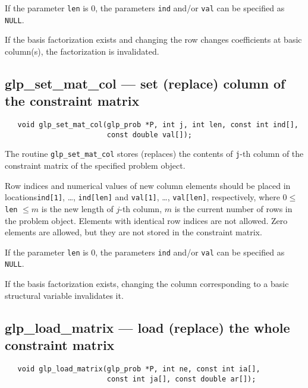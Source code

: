 If the parameter \verb|len| is 0, the parameters \verb|ind| and/or
\verb|val| can be specified as \verb|NULL|.

\note

If the basis factorization exists and changing the row changes
coefficients at basic column(s), the factorization is invalidated.

\subsection{glp\_set\_mat\_col --- set (replace) column of the
constr\-aint matrix}

\synopsis

\begin{verbatim}
   void glp_set_mat_col(glp_prob *P, int j, int len, const int ind[],
                        const double val[]);
\end{verbatim}

\description

The routine \verb|glp_set_mat_col| stores (replaces) the contents of
\verb|j|-th column of the constraint matrix of the specified problem
object.

Row indices and numerical values of new column elements should be
placed in locations\linebreak \verb|ind[1]|, \dots, \verb|ind[len]| and
\verb|val[1]|, \dots, \verb|val[len]|, respectively, where
$0 \leq$ \verb|len| $\leq m$ is the new length of $j$-th column, $m$ is
the current number of rows in the problem object. Elements with
identical row indices are not allowed. Zero elements are allowed, but
they are not stored in the constraint matrix.

If the parameter \verb|len| is 0, the parameters \verb|ind| and/or
\verb|val| can be specified as \verb|NULL|.

\note

If the basis factorization exists, changing the column corresponding
to a basic structural variable invalidates it.

\newpage

\subsection{glp\_load\_matrix --- load (replace) the whole constraint
matrix}

\synopsis

\begin{verbatim}
   void glp_load_matrix(glp_prob *P, int ne, const int ia[],
                        const int ja[], const double ar[]);
\end{verbatim}

